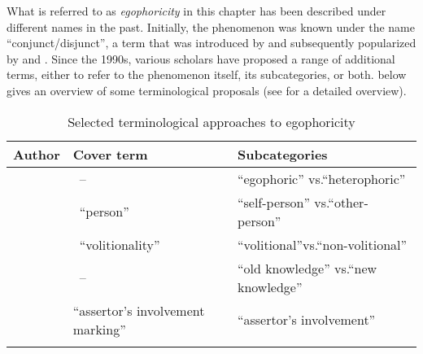 \documentclass[output=paper]{langsci/langscibook}
\begin{document}
What is referred to as \emph{egophoricity} in this chapter has been described under different names in the past. Initially, the phenomenon was known under the name “conjunct/disjunct”, a term that was introduced by \cite{HaleWatters1973} and subsequently popularized by \cite{Hale1980} and \cite{DeLancey1990}. Since the 1990s, various scholars have proposed a range of additional terms, either to refer to the phenomenon itself, its subcategories, or both.  below gives an overview of some terminological proposals (see \citealt{SanRoque2018} for a detailed overview).

\begin{table}
\begin{tabularx}{\textwidth}{XXQ}
\lsptoprule
\textbf{Author}	&	\textbf{Cover term} 	&	\textbf{Subcategories}\\
\midrule
~\newline\cite{Tournadre1991}  &~\newline  – & “egophoric” \newline vs.\newline “heterophoric”\\

\tablevspace
~\newline\cite{Sun1993}	&~\newline	“person”	&	“self-person” \newline vs.\newline “other-person”	\\

\tablevspace
~\newline\cite{Haller2000}	&~\newline	“volitionality”	&	“volitional”\newline vs.\newline “non-volitional”\\

\tablevspace
~\newline\cite{Huber2005} 	&~\newline	–	&	“old knowledge” \newline vs.\newline “new knowledge”	\\

\tablevspace
\cite{Creissels2008}	&	“assertor’s involvement marking”	&	“assertor’s  involvement”\\
\lspbottomrule
\end{tabularx}
\caption{Selected terminological approaches to egophoricity}
\label{tab:mw1}
\end{table}	
\end{document}
